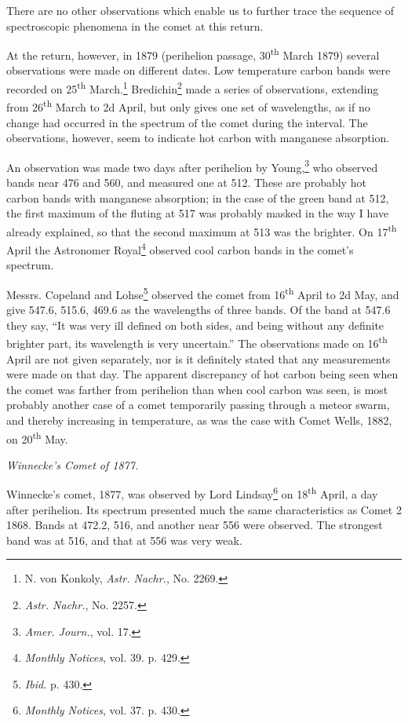 \documentclass[a4paper, 12pt, oneside, polutonikogreek, english]{article}
\begin{document}
There are no other observations which enable us to further trace the sequence of spectroscopic phenomena in the comet at this return.

At the return, however, in 1879 (perihelion passage, 30\textsuperscript{th} March 1879) several observations were made on different dates. Low temperature carbon bands were recorded on 25\textsuperscript{th} March.\footnote{N. von Konkoly, \emph{Astr. Nachr.}, No. 2269.} Bredichin\footnote{\emph{Astr. Nachr.}, No. 2257.} made a series of observations, extending from 26\textsuperscript{th} March to 2d April, but only gives one set of wavelengths, as if no change had occurred in the spectrum of the comet during the interval. The observations, however, seem to indicate hot carbon with manganese absorption.

An observation was made two days after perihelion by Young,\footnote{\emph{Amer. Journ.}, vol. 17.} who observed bands near 476 and 560, and measured one at 512. These are probably hot carbon bands with manganese absorption; in the case of the green band at 512, the first maximum of the fluting at 517 was probably masked in the way I have already explained, so that the second maximum at 513 was the brighter. On 17\textsuperscript{th} April the Astronomer Royal\footnote{\emph{Monthly Notices}, vol. 39. p. 429.} observed cool carbon bands in the comet's spectrum.

Messrs. Copeland and Lohse\footnote{\emph{Ibid.} p. 430.} observed the comet from 16\textsuperscript{th} April to 2d May, and give 547.6, 515.6, 469.6 as the wavelengths of three bands. Of the band at 547.6 they say, ``It was very ill defined on both sides, and being without any definite brighter part, its wavelength is very uncertain.'' The observations made on 16\textsuperscript{th} April are not given separately, nor is it definitely stated that any measurements were made on that day. The apparent discrepancy of hot carbon being seen when the comet was farther from perihelion than when cool carbon was seen, is most probably another case of a comet temporarily passing through a meteor swarm, and thereby increasing in temperature, as was the case with Comet Wells, 1882, on 20\textsuperscript{th} May.

\emph{Winnecke’s Comet of 1877.}

Winnecke's comet, 1877, was observed by Lord Lindsay\footnote{\emph{Monthly Notices}, vol. 37. p. 430.} on 18\textsuperscript{th} April, a day after perihelion. Its spectrum presented much the same characteristics as Comet 2 1868. Bands at 472.2, 516, and another near 556 were observed. The strongest band was at 516, and that at 556 was very weak.
\end{document}
